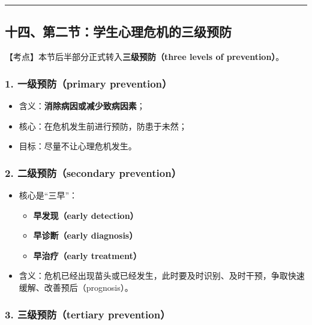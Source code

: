 \documentclass[
  chinese,
  9pt,
  a4paper,
]{ctexart}
\providecommand{\tightlist}{%
  \setlength{\itemsep}{0pt}\setlength{\parskip}{0pt}}
\begin{document}
\begin{center}\rule{0.5\linewidth}{0.5pt}\end{center}

\subsection{十四、第二节：学生心理危机的三级预防}\label{ux5341ux56dbux7b2cux4e8cux8282ux5b66ux751fux5fc3ux7406ux5371ux673aux7684ux4e09ux7ea7ux9884ux9632}

【考点】本节后半部分正式转入\textbf{三级预防（three levels of
prevention）}。

\subsubsection{1. 一级预防（primary
prevention）}\label{ux4e00ux7ea7ux9884ux9632primary-prevention}

\begin{itemize}
\tightlist
\item
  含义：\textbf{消除病因或减少致病因素}；
\item
  核心：在危机发生前进行预防，防患于未然；
\item
  目标：尽量不让心理危机发生。
\end{itemize}

\subsubsection{2. 二级预防（secondary
prevention）}\label{ux4e8cux7ea7ux9884ux9632secondary-prevention}

\begin{itemize}
\item
  核心是``三早''：

  \begin{itemize}
  \tightlist
  \item
    \textbf{早发现（early detection）}
  \item
    \textbf{早诊断（early diagnosis）}
  \item
    \textbf{早治疗（early treatment）}
  \end{itemize}
\item
  含义：危机已经出现苗头或已经发生，此时要及时识别、及时干预，争取快速缓解、改善预后（prognosis）。
\end{itemize}

\subsubsection{3. 三级预防（tertiary
prevention）}\label{ux4e09ux7ea7ux9884ux9632tertiary-prevention}
\end{document}

